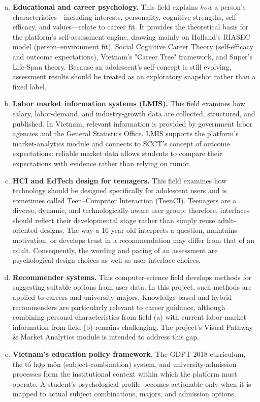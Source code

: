 \documentclass[a4paper]{article}
\begin{document}
\begin{enumerate}[a.]
    \item \textbf{Educational and career psychology.} This field explains \textit{how} a person's characteristics---including interests, personality, cognitive strengths, self-efficacy, and values---relate to career fit. It provides the theoretical basis for the platform's self-assessment engine, drawing mainly on Holland's RIASEC model (person--environment fit), Social Cognitive Career Theory (self-efficacy and outcome expectations), Vietnam's "Career Tree" framework, and Super's Life-Span theory. Because an adolescent's self-concept is still evolving, assessment results should be treated as an exploratory snapshot rather than a fixed label.
    \item \textbf{Labor market information systems (LMIS).} This field examines how salary, labor-demand, and industry-growth data are collected, structured, and published. In Vietnam, relevant information is provided by government labor agencies and the General Statistics Office. LMIS supports the platform's market-analytics module and connects to SCCT's concept of outcome expectations: reliable market data allows students to compare their expectations with evidence rather than relying on rumor.
    \item \textbf{HCI and EdTech design for teenagers.} This field examines how technology should be designed specifically for adolescent users and is sometimes called Teen--Computer Interaction (TeenCI). Teenagers are a diverse, dynamic, and technologically aware user group; therefore, interfaces should reflect their developmental stage rather than simply reuse adult-oriented designs. The way a 16-year-old interprets a question, maintains motivation, or develops trust in a recommendation may differ from that of an adult. Consequently, the wording and pacing of an assessment are psychological design choices as well as user-interface choices.
    \item \textbf{Recommender systems.} This computer-science field develops methods for suggesting suitable options from user data. In this project, such methods are applied to careers and university majors. Knowledge-based and hybrid recommenders are particularly relevant to career guidance, although combining personal characteristics from field (a) with current labor-market information from field (b) remains challenging. The project's Visual Pathway \& Market Analytics module is intended to address this gap.
    \item \textbf{Vietnam's education policy framework.} The GDPT 2018 curriculum, the tổ hợp môn (subject-combination) system, and university-admission processes form the institutional context within which the platform must operate. A student's psychological profile becomes actionable only when it is mapped to actual subject combinations, majors, and admission options.
\end{enumerate}
\end{document}
